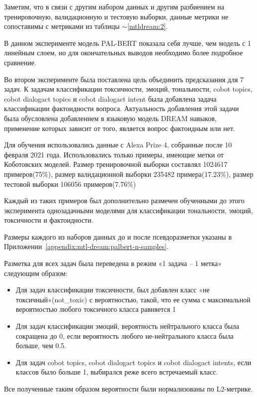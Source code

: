 Заметим, что в связи с другим набором данных и другим разбиением на тренировочную, валидационную и тестовую выборки, данные метрики не сопоставимы с метриками из таблицы $\sim$\ref{mtldream:2}.
 
В данном эксперименте модель PAL-BERT показала себя лучше, чем модель с 1 линейным слоем, но для окончательных выводов необходимо более подробное сравнение.

Во втором эксперименте была поставлена цель объединить предсказания для 7 задач. К задачам классификации токсичности, эмоций, тональности, cobot topics, cobot dialogact topics и cobot dialogact intent была добавлена задача классификации фактоидности вопроса. Актуальность добавления этой задачи была обусловлена добавлением в языковую модель {DREAM} навыков, применение которых зависит от того, является вопрос фактоидным или нет.

Для обучения использовались данные с Alexa Prize 4, собранные после 10 февраля 2021 года. Использовались только примеры, имеющие метки от Коботовских моделей. Размер тренировочной выборки составлял 1024617 примеров(75\%), размер валидационной выборки 235482 примера(17.23\%), размер тестовой выборки 106056 примеров(7.76\%)

Каждый из таких примеров был дополнительно размечен обученными до этого эксперимента однозадачными моделями для классификации тональности, эмоций, токсичности и фактоидности.

Размеры каждого из наборов данных до и после псевдоразметки указаны в Приложении~\ref{appendix:mtl-dream:palbert-n-samples}. 

Разметка для всех задач была переведена в режим «1 задача -- 1 метка» следующим образом:
\begin{itemize}
\item Для задач классификации токсичности, был добавлен класс «не токсичный»({not\_toxic}) с вероятностью, такой, что ее сумма с максимальной вероятностью любого токсичного класса равняется 1
\item Для задач классификации эмоций, вероятность нейтрального класса была сокращена до 0, если вероятность любого не-нейтрального класса была больше, чем 0.5.
\item Для задач cobot topics, cobot dialogact topics и cobot dialogact intents, если классов было больше 1, выбирался реже всего встречаемый класс.
\end{itemize}
Все полученные таким образом вероятности были нормализованы по L2-метрике.

